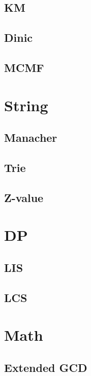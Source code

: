     \subsection{KM}
        
    \subsection{Dinic}
        
    \subsection{MCMF}
        

\section{String}
    \subsection{Manacher}
        
    \subsection{Trie}
        
    \subsection{Z-value}
        

\section{DP}
    \subsection{LIS}
        
    \subsection{LCS}
        

\section{Math}
    \subsection{Extended GCD}
        

